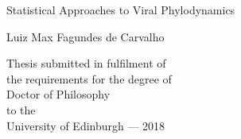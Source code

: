 \thispagestyle{empty}
\begin{minipage}{\textwidth}
\end{minipage}
\begin{center}
\vspace{2cm}
{ \Huge Statistical Approaches to Viral Phylodynamics
  \par
  \vspace{0.5cm} 
{\Large Luiz Max Fagundes de Carvalho \par}
}
\end{center}
\vfill
\begin{center}
\vspace{6cm}    
\centerline{}
\vspace{0.5cm}
Thesis submitted in fulfilment of\\
the requirements for the degree of\\ 
Doctor of Philosophy\\ 
to the\\
University of Edinburgh --- 2018
\end{center}

\newpage
\thispagestyle{empty}
% 


